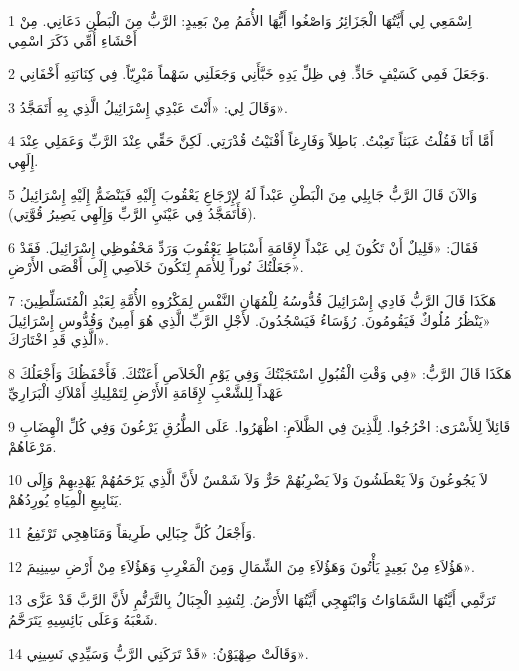 \par 1 اِسْمَعِي لِي أَيَّتُهَا الْجَزَائِرُ وَاصْغُوا أَيُّهَا الأُمَمُ مِنْ بَعِيدٍ: الرَّبُّ مِنَ الْبَطْنِ دَعَانِي. مِنْ أَحْشَاءِ أُمِّي ذَكَرَ اسْمِي
\par 2 وَجَعَلَ فَمِي كَسَيْفٍ حَادٍّ. فِي ظِلِّ يَدِهِ خَبَّأَنِي وَجَعَلَنِي سَهْماً مَبْرِيّاً. فِي كِنَانَتِهِ أَخْفَانِي.
\par 3 وَقَالَ لِي: «أَنْتَ عَبْدِي إِسْرَائِيلُ الَّذِي بِهِ أَتَمَجَّدُ».
\par 4 أَمَّا أَنَا فَقُلْتُ عَبَثاً تَعِبْتُ. بَاطِلاً وَفَارِغاً أَفْنَيْتُ قُدْرَتِي. لَكِنَّ حَقِّي عِنْدَ الرَّبِّ وَعَمَلِي عِنْدَ إِلَهِي.
\par 5 وَالآنَ قَالَ الرَّبُّ جَابِلِي مِنَ الْبَطْنِ عَبْداً لَهُ لإِرْجَاعِ يَعْقُوبَ إِلَيْهِ فَيَنْضَمُّ إِلَيْهِ إِسْرَائِيلُ (فَأَتَمَجَّدُ فِي عَيْنَيِ الرَّبِّ وَإِلَهِي يَصِيرُ قُوَّتِي).
\par 6 فَقَالَ: «قَلِيلٌ أَنْ تَكُونَ لِي عَبْداً لإِقَامَةِ أَسْبَاطِ يَعْقُوبَ وَرَدِّ مَحْفُوظِي إِسْرَائِيلَ. فَقَدْ جَعَلْتُكَ نُوراً لِلأُمَمِ لِتَكُونَ خَلاَصِي إِلَى أَقْصَى الأَرْضِ».
\par 7 هَكَذَا قَالَ الرَّبُّ فَادِي إِسْرَائِيلَ قُدُّوسُهُ لِلْمُهَانِ النَّفْسِ لِمَكْرُوهِ الأُمَّةِ لِعَبْدِ الْمُتَسَلِّطِينَ: «يَنْظُرُ مُلُوكٌ فَيَقُومُونَ. رُؤَسَاءُ فَيَسْجُدُونَ. لأَجْلِ الرَّبِّ الَّذِي هُوَ أَمِينٌ وَقُدُّوسِ إِسْرَائِيلَ الَّذِي قَدِ اخْتَارَكَ».
\par 8 هَكَذَا قَالَ الرَّبُّ: «فِي وَقْتِ الْقُبُولِ اسْتَجَبْتُكَ وَفِي يَوْمِ الْخَلاَصِ أَعَنْتُكَ. فَأَحْفَظُكَ وَأَجْعَلُكَ عَهْداً لِلشَّعْبِ لإِقَامَةِ الأَرْضِ لِتَمْلِيكِ أَمْلاَكِ الْبَرَارِيِّ
\par 9 قَائِلاً لِلأَسْرَى: اخْرُجُوا. لِلَّذِينَ فِي الظَّلاَمِ: اظْهَرُوا. عَلَى الطُّرُقِ يَرْعُونَ وَفِي كُلِّ الْهِضَابِ مَرْعَاهُمْ.
\par 10 لاَ يَجُوعُونَ وَلاَ يَعْطَشُونَ وَلاَ يَضْرِبُهُمْ حَرٌّ وَلاَ شَمْسٌ لأَنَّ الَّذِي يَرْحَمُهُمْ يَهْدِيهِمْ وَإِلَى يَنَابِيعِ الْمِيَاهِ يُورِدُهُمْ.
\par 11 وَأَجْعَلُ كُلَّ جِبَالِي طَرِيقاً وَمَنَاهِجِي تَرْتَفِعُ.
\par 12 هَؤُلاَءِ مِنْ بَعِيدٍ يَأْتُونَ وَهَؤُلاَءِ مِنَ الشِّمَالِ وَمِنَ الْمَغْرِبِ وَهَؤُلاَءِ مِنْ أَرْضِ سِينِيمَ».
\par 13 تَرَنَّمِي أَيَّتُهَا السَّمَاوَاتُ وَابْتَهِجِي أَيَّتُهَا الأَرْضُ. لِتُشِدِ الْجِبَالُ بِالتَّرَنُّمِ لأَنَّ الرَّبَّ قَدْ عَزَّى شَعْبَهُ وَعَلَى بَائِسِيهِ يَتَرَحَّمُ.
\par 14 وَقَالَتْ صِهْيَوْنُ: «قَدْ تَرَكَنِي الرَّبُّ وَسَيِّدِي نَسِينِي».
